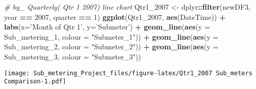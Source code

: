 \documentclass[]{article}
\newenvironment{Shaded}{\begin{snugshade}}{\end{snugshade}}
\newcommand{\CommentTok}[1]{\textcolor[rgb]{0.56,0.35,0.01}{\textit{#1}}}
\newcommand{\DataTypeTok}[1]{\textcolor[rgb]{0.13,0.29,0.53}{#1}}
\newcommand{\DecValTok}[1]{\textcolor[rgb]{0.00,0.00,0.81}{#1}}
\newcommand{\KeywordTok}[1]{\textcolor[rgb]{0.13,0.29,0.53}{\textbf{#1}}}
\newcommand{\NormalTok}[1]{#1}
\newcommand{\OperatorTok}[1]{\textcolor[rgb]{0.81,0.36,0.00}{\textbf{#1}}}
\newcommand{\StringTok}[1]{\textcolor[rgb]{0.31,0.60,0.02}{#1}}
\begin{document}
\begin{Shaded}
\begin{Highlighting}[]
\CommentTok{# by_ Quarterly( Qtr 1 2007) line chart}
\NormalTok{Qtr1_}\DecValTok{2007}\NormalTok{ <-}\StringTok{ }\NormalTok{dplyr}\OperatorTok{::}\KeywordTok{filter}\NormalTok{(newDF3, year }\OperatorTok{==}\StringTok{ }\DecValTok{2007}\NormalTok{, quarter }\OperatorTok{==}\StringTok{ }\DecValTok{1}\NormalTok{)}
  \KeywordTok{ggplot}\NormalTok{(Qtr1_}\DecValTok{2007}\NormalTok{, }\KeywordTok{aes}\NormalTok{(DateTime)) }\OperatorTok{+}
\StringTok{    }\KeywordTok{labs}\NormalTok{(}\DataTypeTok{x=}\StringTok{'Month of Qtr 1'}\NormalTok{, }\DataTypeTok{y=}\StringTok{'Submeter'}\NormalTok{) }\OperatorTok{+}
\StringTok{     }\KeywordTok{geom_line}\NormalTok{(}\KeywordTok{aes}\NormalTok{(}\DataTypeTok{y =}\NormalTok{ Sub_metering_}\DecValTok{1}\NormalTok{, }\DataTypeTok{colour =} \StringTok{"Submeter_1"}\NormalTok{)) }\OperatorTok{+}
\StringTok{     }\KeywordTok{geom_line}\NormalTok{(}\KeywordTok{aes}\NormalTok{(}\DataTypeTok{y =}\NormalTok{ Sub_metering_}\DecValTok{2}\NormalTok{, }\DataTypeTok{colour =} \StringTok{"Submeter_2"}\NormalTok{)) }\OperatorTok{+}
\StringTok{     }\KeywordTok{geom_line}\NormalTok{(}\KeywordTok{aes}\NormalTok{(}\DataTypeTok{y =}\NormalTok{ Sub_metering_}\DecValTok{3}\NormalTok{, }\DataTypeTok{colour =} \StringTok{"Submeter_3"}\NormalTok{))}
\end{Highlighting}
\end{Shaded}

\texttt{[image: Sub\_metering\_Project\_files/figure-latex/Qtr1\_2007 Sub\_meters Comparison-1.pdf]}
\end{document}
